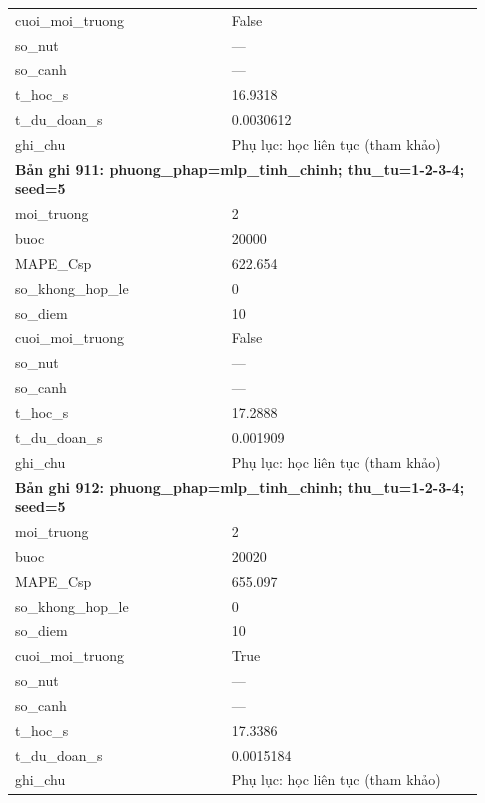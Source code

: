 \begin{longtable}{p{0.43\linewidth}p{0.50\linewidth}}
cuoi\_\allowbreak moi\_\allowbreak truong & False \\
so\_\allowbreak nut & — \\
so\_\allowbreak canh & — \\
t\_\allowbreak hoc\_\allowbreak s & 16.9318 \\
t\_\allowbreak du\_\allowbreak doan\_\allowbreak s & 0.0030612 \\
ghi\_\allowbreak chu & Phụ lục: học liên tục (tham khảo) \\
\midrule
\multicolumn{2}{p{0.95\linewidth}}{\textbf{Bản ghi 911: phuong\_phap=mlp\_tinh\_chinh; thu\_tu=1-2-3-4; seed=5}} \\
moi\_\allowbreak truong & 2 \\
buoc & 20000 \\
MAPE\_\allowbreak Csp & 622.654 \\
so\_\allowbreak khong\_\allowbreak hop\_\allowbreak le & 0 \\
so\_\allowbreak diem & 10 \\
cuoi\_\allowbreak moi\_\allowbreak truong & False \\
so\_\allowbreak nut & — \\
so\_\allowbreak canh & — \\
t\_\allowbreak hoc\_\allowbreak s & 17.2888 \\
t\_\allowbreak du\_\allowbreak doan\_\allowbreak s & 0.001909 \\
ghi\_\allowbreak chu & Phụ lục: học liên tục (tham khảo) \\
\midrule
\multicolumn{2}{p{0.95\linewidth}}{\textbf{Bản ghi 912: phuong\_phap=mlp\_tinh\_chinh; thu\_tu=1-2-3-4; seed=5}} \\
moi\_\allowbreak truong & 2 \\
buoc & 20020 \\
MAPE\_\allowbreak Csp & 655.097 \\
so\_\allowbreak khong\_\allowbreak hop\_\allowbreak le & 0 \\
so\_\allowbreak diem & 10 \\
cuoi\_\allowbreak moi\_\allowbreak truong & True \\
so\_\allowbreak nut & — \\
so\_\allowbreak canh & — \\
t\_\allowbreak hoc\_\allowbreak s & 17.3386 \\
t\_\allowbreak du\_\allowbreak doan\_\allowbreak s & 0.0015184 \\
ghi\_\allowbreak chu & Phụ lục: học liên tục (tham khảo) \\

\end{longtable}
